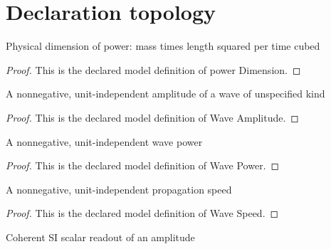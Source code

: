 \section{Declaration topology}
\begin{definition}
  \label{def:physics:phyx-mini-0307:phyxminiproblems-problemphyxmini0307-powerdimension}
  Physical dimension of power: mass times length squared per time cubed
\end{definition}
\begin{proof}
  This is the declared model definition of power Dimension.
\end{proof}
\begin{definition}
  \label{def:physics:phyx-mini-0307:phyxminiproblems-problemphyxmini0307-waveamplitude}
  A nonnegative, unit-independent amplitude of a wave of unspecified kind
\end{definition}
\begin{proof}
  This is the declared model definition of Wave Amplitude.
\end{proof}
\begin{definition}
  \label{def:physics:phyx-mini-0307:phyxminiproblems-problemphyxmini0307-wavepower}
  A nonnegative, unit-independent wave power
\end{definition}
\begin{proof}
  This is the declared model definition of Wave Power.
\end{proof}
\begin{definition}
  \label{def:physics:phyx-mini-0307:phyxminiproblems-problemphyxmini0307-wavespeed}
  A nonnegative, unit-independent propagation speed
\end{definition}
\begin{proof}
  This is the declared model definition of Wave Speed.
\end{proof}
\begin{definition}
  \label{def:physics:phyx-mini-0307:phyxminiproblems-problemphyxmini0307-amplitudesireadout}
  Coherent SI scalar readout of an amplitude
\end{definition}
